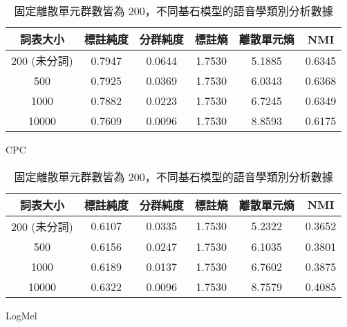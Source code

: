 \begin{table}[!htbp]
            \begin{subtable}[t]{\textwidth}
                \centering
                \begin{tabular}{|c|c|c|c|c|c|} \hline 
                        詞表大小  & 標註純度 & 分群純度 & 標註熵 & 離散單元熵 &     NMI  \\ \hline 
 200 (未分詞)&         0.7947 &   0.0644 &         1.7530 &     5.1885 &  0.6345 \\ \hline 
                            500 &  0.7925 &    0.0369 &   1.7530   & 6.0343 &    0.6368 \\ \hline %
                           1000 &  0.7882 &    0.0223 &   1.7530   & 6.7245 &    0.6349 \\ \hline %
                          10000 &  0.7609 &    0.0096 &   1.7530   & 8.8593 &    0.6175 \\ \hline %
                \end{tabular}
\caption{CPC}
                \label{tab:ch4-pcls-model-cpc}
            \end{subtable}        

            \jefftablesep        

            \begin{subtable}[t]{\textwidth}
                \centering
                \begin{tabular}{|c|c|c|c|c|c|} \hline 
                詞表大小 & 標註純度 & 分群純度 & 標註熵 & 離散單元熵 &     NMI \\ \hline 
  200 (未分詞)&         0.6107 &   0.0335 &         1.7530 &     5.2322 &  0.3652 \\ \hline 
                            500 &  0.6156 &    0.0247 &   1.7530   & 6.1035 &    0.3801 \\ \hline %
                           1000 &  0.6189 &    0.0137 &   1.7530   & 6.7602 &    0.3875 \\ \hline %
                          10000 &  0.6322 &    0.0096 &   1.7530   & 8.7579 &    0.4085 \\ \hline %
                \end{tabular}
\caption{LogMel}
                \label{tab:ch4-pcls-model-logmel}
            \end{subtable}        

\caption{固定離散單元群數皆為 200，不同基石模型的語音學類別分析數據}
            \label{tab:ch4-models-pcls}
        \end{table}
        
